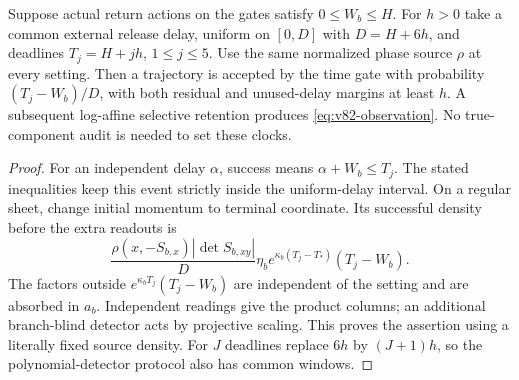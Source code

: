 \begin{proposition}
\label{prop:v82-physical}
Suppose actual return actions on the gates satisfy $0\le W_b\le H$.
For $h>0$ take a common external release delay, uniform on
$[0,D]$ with $D=H+6h$, and deadlines $T_j=H+jh$, $1\le j\le5$.
Use the same normalized phase source $\rho$ at every setting. Then a
trajectory is accepted by the time gate with probability $(T_j-W_b)/D$,
with both residual and unused-delay margins at least $h$.
A subsequent log-affine selective retention produces
\eqref{eq:v82-observation}. No true-component audit is needed to set
these clocks.
\end{proposition}
\begin{proof}
For an independent delay $\alpha$, success means $\alpha+W_b\le T_j$.
The stated inequalities keep this event strictly inside the uniform-delay
interval. On a regular sheet, change initial momentum to terminal
coordinate. Its successful density before the extra readouts is
\[
 \frac{\rho(x,-S_{b,x})|\det S_{b,xy}|}{D}
       \eta_b e^{\kappa_b(T_j-T_*)}(T_j-W_b).
\]
The factors outside $e^{\kappa_bT_j}(T_j-W_b)$ are independent of the
setting and are absorbed in $a_b$. Independent readings give the product
columns; an additional branch-blind detector acts by projective scaling.
This proves the assertion using a literally fixed source density.
For $J$ deadlines replace $6h$ by $(J+1)h$, so the polynomial-detector
protocol also has common windows.
\end{proof}

